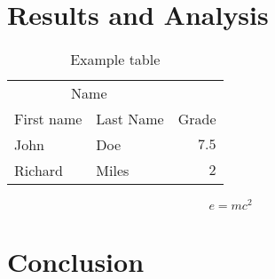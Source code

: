 \documentclass[twoside]{article}
\begin{document}
\begin{multicols}{2}
\section{Results and Analysis}

\begin{table}[H]
\caption{Example table}
\centering
\begin{tabular}{llr}
\toprule
\multicolumn{2}{c}{Name} \\
\cmidrule(r){1-2}
First name & Last Name & Grade \\
\midrule
John & Doe & $7.5$ \\
Richard & Miles & $2$ \\
\bottomrule
\end{tabular}
\end{table}

\lipsum[5] %

\begin{equation}
\label{eq:emc}
e = mc^2
\end{equation}

\lipsum[6] %


\section{Conclusion}


\end{multicols}
\end{document}
